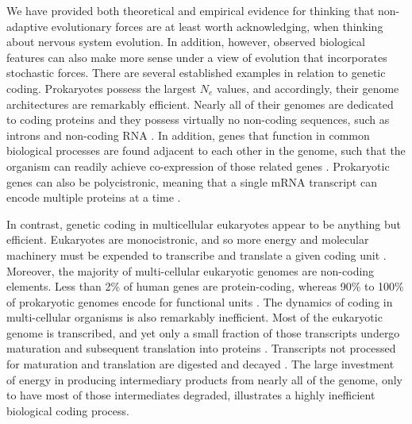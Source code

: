 \documentclass[twocolumn]{article}
\begin{document}
We have provided both theoretical and empirical evidence for thinking that non-adaptive evolutionary forces are at least worth acknowledging, when thinking about nervous system evolution. In addition, however, observed biological features can also make more sense under a view of evolution that incorporates stochastic forces. There are several established examples in relation to genetic coding. Prokaryotes possess the largest $N_e$ values, and accordingly, their genome architectures are remarkably efficient. Nearly all of their genomes are dedicated to coding proteins and they possess virtually no non-coding sequences, such as introns and non-coding RNA \cite{lynch2007origins, milo2016cell}. In addition, genes that function in common biological processes are found adjacent to each other in the genome, such that the organism can readily achieve co-expression of those related genes \cite{overbeek_matlsev_1999}. Prokaryotic genes can also be polycistronic, meaning that a single mRNA transcript can encode multiple proteins at a time \cite{kozak_1999}. 

In contrast, genetic coding in multicellular eukaryotes appear to be anything but efficient. Eukaryotes are monocistronic, and so more energy and molecular machinery must be expended to transcribe and translate a given coding unit \cite{kozak_1999}. Moreover, the majority of multi-cellular eukaryotic genomes are non-coding elements. Less than 2\% of human genes are protein-coding, whereas 90\% to 100\% of prokaryotic genomes encode for functional units \cite{milo2016cell}. The dynamics of coding in multi-cellular organisms is also remarkably inefficient. Most of the eukaryotic genome is transcribed, and yet only a small fraction of those transcripts undergo maturation and subsequent translation into proteins \cite{menet_rosbash_2012}. Transcripts not processed for maturation and translation are digested and decayed \cite{mcnicoll_neugebauer_2014}. The large investment of energy in producing intermediary products from nearly all of the genome, only to have most of those intermediates degraded, illustrates a highly inefficient biological coding process. 
\end{document}
